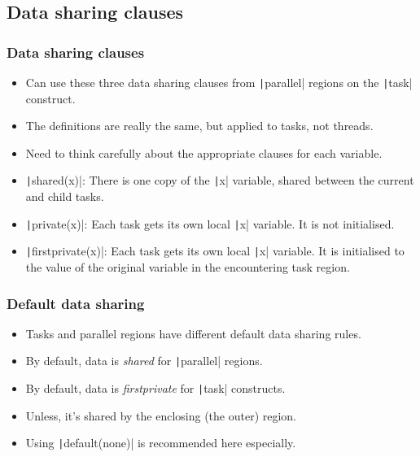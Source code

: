 \documentclass{beamer}
\begin{document}
\subsection{Data sharing clauses}
\begin{frame}
\frametitle{Data sharing clauses}
\begin{itemize}
  \item Can use these three data sharing clauses from \texttt|parallel| regions on the \texttt|task| construct.
  \item The definitions are really the same, but applied to tasks, not threads.
  \item Need to think carefully about the appropriate clauses for each variable.
  \item \texttt|shared(x)|: There is one copy of the \texttt|x| variable, shared between the current and child tasks.
  \item \texttt|private(x)|: Each task gets its own local \texttt|x| variable. It is not initialised.
  \item \texttt|firstprivate(x)|: Each task gets its own local \texttt|x| variable. It is initialised to the value of the original variable in the encountering task region.
\end{itemize}
\end{frame}

\begin{frame}
\frametitle{Default data sharing}
\begin{itemize}
  \item Tasks and parallel regions have different default data sharing rules.
  \item By default, data is \emph{shared} for \texttt|parallel| regions.
  \item By default, data is \emph{firstprivate} for \texttt|task| constructs.
  \item Unless, it's shared by the enclosing (the outer) region.
  \item Using \texttt|default(none)| is recommended here especially.
\end{itemize}
\end{frame}

\end{document}
